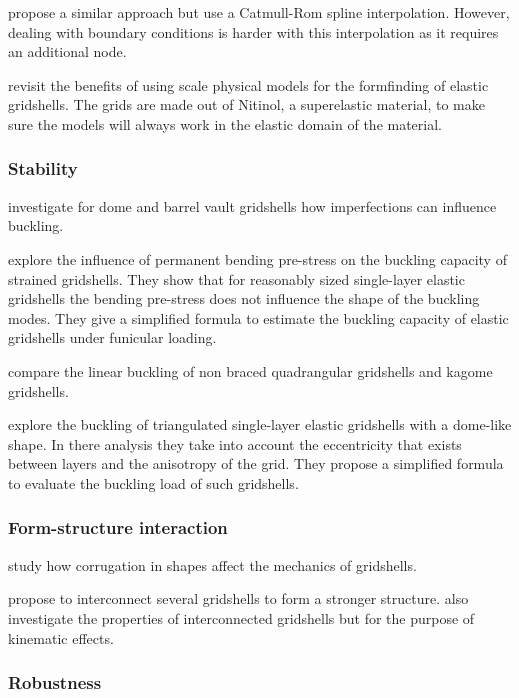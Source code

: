 propose a similar approach but use a Catmull-Rom spline interpolation. However, dealing with boundary conditions is harder with this interpolation as it requires an additional node.

 revisit the benefits of using scale physical models for the formfinding of elastic gridshells. The grids are made out of Nitinol, a superelastic material, to make sure the models will always work in the elastic domain of the material.

\subsubsection{Stability}

 investigate for dome and barrel vault gridshells how imperfections can influence buckling.

 explore the influence of permanent bending pre-stress on the buckling capacity of strained gridshells. They show that for reasonably sized single-layer elastic gridshells the bending pre-stress does not influence the shape of the buckling modes. They give a simplified formula to estimate the buckling capacity of elastic gridshells under funicular loading.

 compare the linear buckling of non braced quadrangular gridshells and kagome gridshells.

\citet{Lefevre2015} explore the buckling of triangulated single-layer elastic gridshells with a dome-like shape. In there analysis they take into account the eccentricity that exists between layers and the anisotropy of the grid. They propose a simplified formula to evaluate the buckling load of such gridshells.

\subsubsection{Form-structure interaction}

 study how corrugation in shapes affect the mechanics of gridshells.

 propose to interconnect several gridshells to form a stronger structure. also investigate the properties of interconnected gridshells but for the purpose of kinematic effects.

\subsubsection{Robustness}

